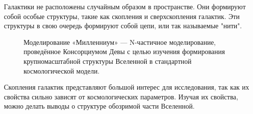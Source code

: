 \Introduction

Галактики не расположены случайным образом в пространстве. Они формируют собой особые структуры, 
такие как скопления и сверхскопления галактик. Эти структуры в свою очередь формируют собой цепи, 
или так называемые "нити".\\

\begin{figure}
    \caption{Моделирование «Милленниум» — N-частичное моделирование, проведённое Консорциумом 
        Девы с целью изучения формирования крупномасштабной структуры Вселенной в стандартной
        космологической модели.}
\end{figure}

Скопления галактик представляют большой интерес для исследования, так как их свойства сильно зависят 
от космологических параметров. Изучая их свойства, можно делать выводы о структуре обозримой части 
Вселенной.\\
